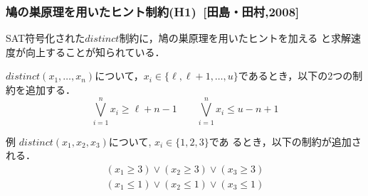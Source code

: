 \documentclass [dvipdfmx,11pt]{beamer}
\newcommand{\distinct}{$distinct$}
\begin{document}
\begin{frame}
  \frametitle{鳩の巣原理を用いたヒント制約(H1)~[田島・田村,2008]}
  SAT符号化された{\distinct}制約に，鳩の巣原理を用いたヒントを加える
  と求解速度が向上することが知られている．
  \begin{block}{}
    $distinct(x_{1},\ldots,x_{n})$について，$x_i \in
    \{\ell,\ell+1,\ldots,u\}$であるとき，以下の2つの制約を追加する．
    \[
      \bigvee_{i=1}^{n}x_{i}\geq \ell+n-1 \qquad
      \bigvee_{i=1}^{n}x_{i}\leq u-n+1
    \]
  \end{block}
  \begin{exampleblock}{例}
    $distinct(x_1, x_2, x_3)$について, $x_i \in \{1,2,3\}$であ
    るとき，以下の制約が追加される．
    \vspace{-3mm}
    \begin{eqnarray*}
      (x_1\geq 3) \lor (x_2 \geq 3) \lor (x_3 \geq 3)\\
      (x_1\leq 1) \lor (x_2 \leq 1) \lor (x_3 \leq 1)
    \end{eqnarray*}
  \end{exampleblock}
\end{frame}
\end{document}

